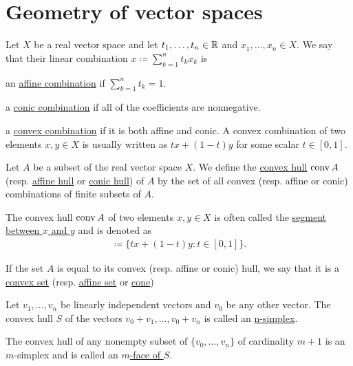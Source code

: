 \section{Geometry of vector spaces}\label{sec:geometry_of_vector_spaces}

\begin{definition}\label{def:real_linear_combinations}
  Let $X$ be a real vector space and let $t_1, \ldots, t_n \in \mathbb R$ and $x_1, \ldots, x_n \in X$. We say that their linear combination $x \coloneqq \sum_{k=1}^n t_k x_k$ is

  \begin{defenum}
    \item\label{def:real_linear_combinations/affine} an \ul{affine combination} if $\sum_{k=1}^n t_k = 1$.
    \item\label{def:real_linear_combinations/conic} a \ul{conic combination} if all of the coefficients are nonnegative.
    \item\label{def:real_linear_combinations/convex} a \ul{convex combination} if it is both affine and conic. A convex combination of two elements $x, y \in X$ is usually written as $tx + (1-t)y$ for some scalar $t \in [0, 1]$.
  \end{defenum}
\end{definition}

\begin{definition}\label{def:linear_combination_hulls}
  Let $A$ be a subset of the real vector space $X$. We define the \ul{convex hull} $\operatorname{conv} A$ (resp. \ul{affine hull} or \ul{conic hull}) of $A$ by the set of all convex (resp. affine or conic) combinations of finite subsets of $A$.

  The convex hull $\operatorname{conv} A$ of two elements $x, y \in X$ is often called the \ul{segment between $x$ and $y$} and is denoted as
  \begin{align*}
    [x, y] \coloneqq \{ tx + (1-t)y \colon t \in [0, 1] \}.
  \end{align*}

  If the set $A$ is equal to its convex (resp. affine or conic) hull, we say that it is a \ul{convex set} (resp. \ul{affine set} or \ul{cone})
\end{definition}

\begin{definition}\label{def:simplex}
  Let $v_1, \ldots, v_n$ be linearly independent vectors and $v_0$ be any other vector. The convex hull $S$ of the vectors $v_0 + v_1, \ldots, v_0 + v_n$ is called an \ul{n-simplex}.

  The convex hull of any nonempty subset of $\{ v_0, \ldots, v_n \}$ of cardinality $m + 1$ is an $m$-simplex and is called an \ul{$m$-face of $S$}.
\end{definition}
